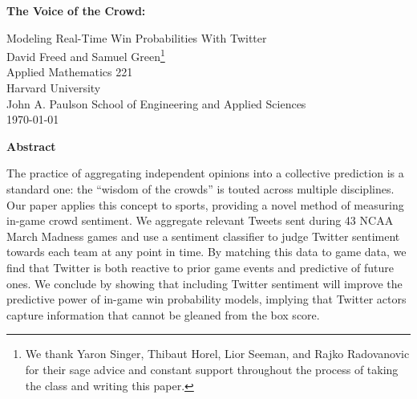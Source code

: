 \documentclass[12pt]{article}
\begin{document}
\renewcommand*{\thefootnote}{\fnsymbol{footnote}}


\begin{titlepage}
\begin{doublespacing}
    \begin{center}
        \vspace*{4cm}
        \Large
        \textbf{The Voice of the Crowd:}
        
        \vspace{0.5cm}
        Modeling Real-Time Win Probabilities With Twitter\\
        \large
        \vspace{1cm}
        David Freed and Samuel Green\footnote{We thank Yaron Singer, Thibaut Horel, Lior Seeman, and Rajko Radovanovic for their sage advice and constant support throughout the process of taking the class and writing this paper.} \\ \vspace{0cm}
        Applied Mathematics 221 \\
        Harvard University \\
        John A. Paulson School of Engineering and Applied Sciences\\
        \today{} \\
       \end{center}
       
       \vspace{3cm}

\end{doublespacing}
\end{titlepage}

\renewcommand*{\thefootnote}{\arabic{footnote}}

\setcounter{page}{1}
\newpage

\begin{doublespacing}

\begin{center}
	\textbf{Abstract} \\
\end{center}
The practice of aggregating independent opinions into a collective prediction is a standard one: the ``wisdom of the crowds'' is touted across multiple disciplines. Our paper applies this concept to sports, providing a novel method of measuring in-game crowd sentiment. We aggregate relevant Tweets sent during 43 NCAA March Madness games and use a sentiment classifier to judge Twitter sentiment towards each team at any point in time. By matching this data to game data, we find that Twitter is both reactive to prior game events and predictive of future ones. We conclude by showing that including Twitter sentiment will improve the predictive power of in-game win probability models, implying that Twitter actors capture information that cannot be gleaned from the box score. 

\end{doublespacing}
	    
\end{document}
